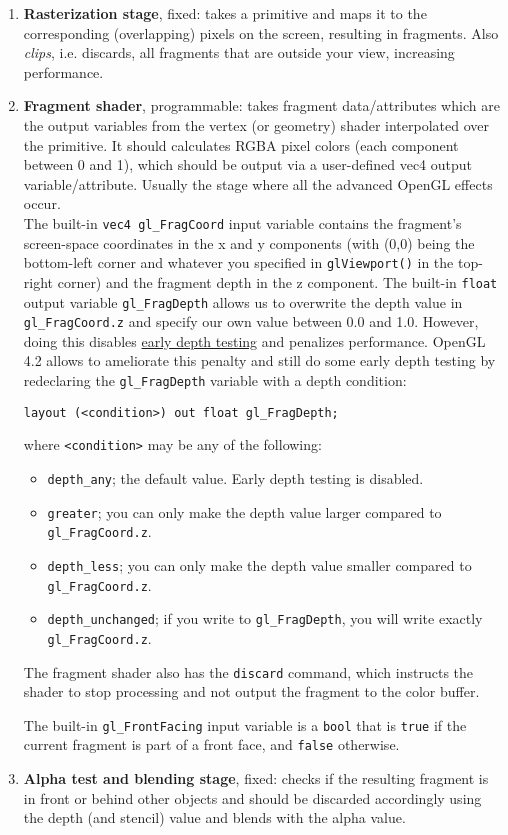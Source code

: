 \documentclass[8pt, table, xcdraw]{article}%
\begin{document}
\begin{enumerate}
    \item \textbf{Rasterization stage}, fixed: takes a primitive and maps it to the corresponding (overlapping) pixels on the screen, resulting in fragments. Also \emph{clips}, i.e. discards, all fragments that are outside your view, increasing performance.
    \item \textbf{Fragment shader}, programmable: takes fragment data/attributes which are the output variables from the vertex (or geometry) shader interpolated over the primitive. It should calculates RGBA pixel colors (each component between 0 and 1), which should be output via a user-defined vec4 output variable/attribute. Usually the stage where all the advanced OpenGL effects occur.\\
    The built-in \lstinline{vec4 gl_FragCoord} input variable contains the fragment's screen-space coordinates in the x and y components (with (0,0) being the bottom-left corner and whatever you specified in \lstinline{glViewport()} in the top-right corner) and the fragment depth in the z component. The built-in \lstinline{float} output variable \lstinline{gl_FragDepth} allows us to overwrite the depth value in \lstinline{gl_FragCoord.z} and specify our own value between 0.0 and 1.0. However, doing this disables \hyperref[depth_buffer]{early depth testing} and penalizes performance. OpenGL 4.2 allows to ameliorate this penalty and still do some early depth testing by redeclaring the \lstinline{gl_FragDepth} variable with a depth condition:
    
    \lstinline{layout (<condition>) out float gl_FragDepth;}
    
    where \lstinline{<condition>} may be any of the following:
    
    \begin{itemize}
        \item \lstinline{depth_any}; the default value. Early depth testing is disabled.
        \item \lstinline{greater}; you can only make the depth value larger compared to \lstinline{gl_FragCoord.z}.
        \item \lstinline{depth_less}; you can only make the depth value smaller compared to \lstinline{gl_FragCoord.z}.
        \item \lstinline{depth_unchanged}; if you write to \lstinline{gl_FragDepth}, you will write exactly \lstinline{gl_FragCoord.z}.
    \end{itemize}
    
    The fragment shader also has the \lstinline{discard} command, which instructs the shader to stop processing and not output the fragment to the color buffer.
    
    The built-in \lstinline{gl_FrontFacing} input variable is a \lstinline{bool} that is \lstinline{true} if the current fragment is part of a front face, and \lstinline{false} otherwise.
    \item \textbf{Alpha test and blending stage}, fixed: checks if the resulting fragment is in front or behind other objects and should be discarded accordingly using the depth (and stencil) value and blends with the alpha value.
\end{enumerate}
\end{document}
